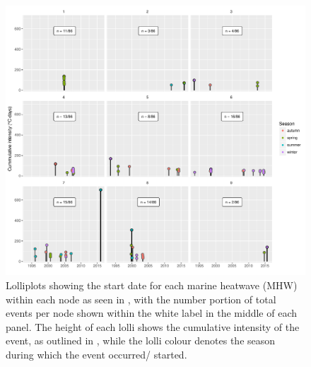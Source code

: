 \documentclass[a4paper,10pt,review]{elsarticle}
\begin{document}
\begin{figure}
\includegraphics[width=1.0\textwidth]{figure_5.pdf}
\caption{Lolliplots showing the start date for each marine heatwave (MHW) within each node as seen in , with the number portion of total events per node shown within the white label in the middle of each panel. The height of each lolli shows the cumulative intensity of the event, as outlined in , while the lolli colour denotes the season during which the event occurred/ started.}
\label{figure5}
\end{figure}
\end{document}

